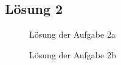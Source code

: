 \documentclass[main.tex]{subfiles}
\begin{document}
\subsection{Lösung 2}
\begin{figure}[h]
    \caption{Lösung der Aufgabe 2a}
    \label{fig:lgs2a}
\end{figure}

\pagebreak
\begin{figure}[h!]
    \caption{Lösung der Aufgabe 2b}
    \label{fig:lgs2b}
\end{figure}
\end{document}
